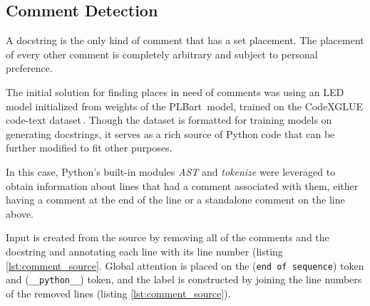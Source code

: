         \subsection{Comment Detection} \label{comment_detection}
            A docstring is the only kind of comment that has a set placement. The placement of every other comment is completely arbitrary and subject to personal preference.
            
            The initial solution for finding places in need of comments was using an LED model initialized from weights of the PLBart\,\cite{plbart2021} model, trained on the CodeXGLUE code-text dataset\,\cite{codexglue}. Though the dataset is formatted for training models on generating docstrings, it serves as a rich source of Python code that can be further modified to fit other purposes.
            
            In this case, Python's built-in modules \emph{AST} and \emph{tokenize} were leveraged to obtain information about lines that had a comment associated with them, either having a comment at the end of the line or a standalone comment on the line above.
            
            Input is created from the source by removing all of the comments and the docstring and annotating each line with its line number (listing \ref{lst:comment_source}. Global attention is placed on the (\texttt{end of sequence}) token and (\texttt{\_\_python\_\_}) token, and the label is constructed by joining the line numbers of the removed lines (listing \ref{lst:comment_source}).
            
